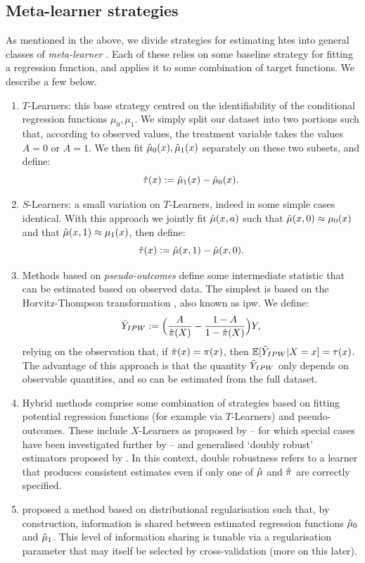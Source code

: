 \documentclass[../thesis.tex]{subfiles}
\begin{document}
\subsection{Meta-learner strategies}
\label{sec:metalearners}
As mentioned in the above, we divide strategies for estimating \glspl{hte} into general classes of \emph{meta-learner} \citep{kunzel_metalearners_2019, curth_nonparametric_2021}. Each of these relies on some baseline strategy for fitting a regression function, and applies it to some combination of target functions. We describe a few below.

\begin{enumerate}
    \item \label{tech:tlearner} $T$-Learners: this base strategy centred on the identifiability of the conditional regression functions $\mu_0, \mu_1$. We simply split our dataset into two portions such that, according to observed values, the treatment variable takes the values $A=0$ or $A=1$. We then fit $\hat{\mu}_0(x), \hat{\mu}_1(x)$ separately on these two subsets, and define:
    \[ \hat{\tau}(x) := \hat{\mu}_1(x) - \hat{\mu}_0(x).\]
    \item $S$-Learners: a small variation on $T$-Learners, indeed in some simple cases identical. With this approach we jointly fit $\hat{\mu}(x,a)$ such that $\hat{\mu}(x,0) \approx \mu_0(x)$ and that $\hat{\mu}(x, 1) \approx \mu_1(x)$, then define:
    \[\hat{\tau}(x) := \hat{\mu}(x,1) - \hat{\mu}(x,0).\]
    \item \label{tech:ipw} Methods based on \emph{pseudo-outcomes} define some intermediate statistic that can be estimated based on observed data. The simplest is based on the Horvitz-Thompson transformation \citep{horvitz_generalization_1952}, also known as \gls{ipw}. We define:
    \[\Tilde{Y}_{IPW} := \Big(\frac{A}{\hat{\pi}(X)} - \frac{1-A}{1-\hat{\pi}(X)}\Big)Y, \]
    relying on the observation that, if $\hat{\pi}(x) = \pi(x)$, then $\mathbb{E}[\Tilde{Y}_{IPW} | X =x] = \tau(x)$. The advantage of this approach is that the quantity $\Tilde{Y}_{IPW}$ only depends on observable quantities, and so can be estimated from the full dataset.
    \item Hybrid methods comprise some combination of strategies based on fitting potential regression functions (for example via $T$-Learners) and pseudo-outcomes. These include $X$-Learners as proposed by \citet{kunzel_metalearners_2019} -- for which special cases have been investigated further by \citet{curth_nonparametric_2021} -- and generalised `doubly robust' estimators proposed by \citet{kennedy_optimal_2020}. In this context, double robustness refers to a learner that produces consistent estimates even if only one of $\hat{\mu}$ and $\hat{\pi}$ are correctly specified.
    \item \citet{shalit_estimating_2017} proposed a method based on distributional regularisation such that, by construction, information is shared between estimated regression functions $\hat{\mu}_0$ and $\hat{\mu}_1$. This level of information sharing is tunable via a regularisation parameter that may itself be selected by cross-validation (more on this later).
\end{enumerate}
\end{document}

